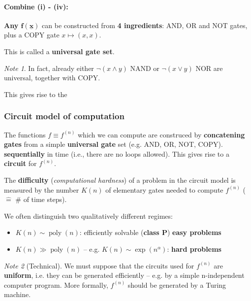 \documentclass[a4paper, 12pt]{article}
\theoremstyle{plain}
\theoremstyle{definition}
\theoremstyle{remark}
\newtheorem*{note}{Note}
\DeclareMathOperator{\poly}{poly}
\begin{document}
\paragraph{Combine (i) - (iv):}

\textbf{Any $\bm{f(\underline{x})}$} can be constructed from \textbf{4 ingredients}: AND, OR and NOT gates, plus a COPY gate $x \mapsto (x,x)$.

This is called a \textbf{universal gate set}.

\begin{note}
  In fact, already either $\lnot (x \land y)$ NAND or $\lnot (x \lor y)$ NOR are universal, together with COPY.
\end{note}

This gives rise to the

\subsubsection*{Circuit model of computation}
The functions $f \equiv f^{(n)}$ which we can compute are construced by \textbf{concatening gates} from a simple \textbf{universal gate} set (e.g. AND, OR, NOT, COPY). \textbf{sequentially} in time (i.e., there are no loops allowed). This gives rise to a \textbf{circuit} for $f^{(n)}$.

The \textbf{difficulty} (\emph{computational hardness}) of a problem in the circuit model is measured by the number $K(n)$ of elementary gates needed to compute $f^{(n)}$ ($\hat{=}$ \# of time steps).

We often distinguish two qualitatively different regimes:
\begin{itemize}
  \item $K(n) \sim \poly(n)$: efficiently solvable (\textbf{class P}) \textbf{easy problems}
  \item $K(n) \gg \poly(n)$ -- e.g. $K(n) \sim \exp(n^\alpha)$: \textbf{hard problems}
\end{itemize}

\begin{note}[Technical]
  We must suppose that the circuits used for $f^{(n)}$ are \textbf{uniform}, i.e. they can be generated efficiently -- e.g. by a simple n-independent computer program. More formally, $f^{(n)}$ should be generated by a Turing machine.
\end{note}
\end{document}

